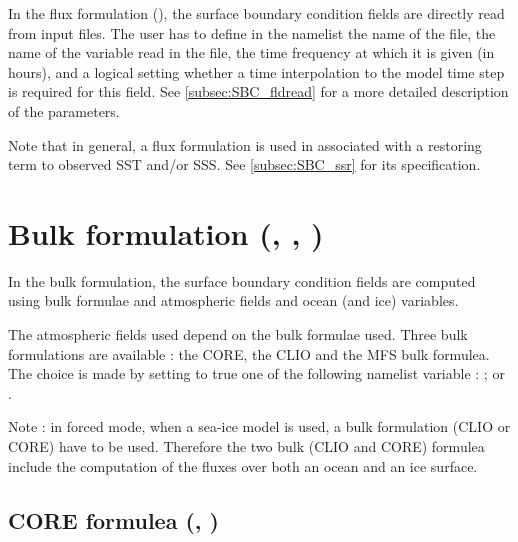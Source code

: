 \documentclass[../tex_main/NEMO_manual]{subfiles}
\begin{document}
In the flux formulation (), the surface boundary 
condition fields are directly read from input files. The user has to define 
in the namelist  the name of the file, the name of the variable 
read in the file, the time frequency at which it is given (in hours), and a logical 
setting whether a time interpolation to the model time step is required 
for this field. See \autoref{subsec:SBC_fldread} for a more detailed description of the parameters.

Note that in general, a flux formulation is used in associated with a 
restoring term to observed SST and/or SSS. See \autoref{subsec:SBC_ssr} for its 
specification.


\section[Bulk formulation {(\textit{sbcblk\{\_core,\_clio,\_mfs\}.F90})}]
			{Bulk formulation {(\protect{}, \protect{}, \protect{})}}
\label{sec:SBC_blk}

In the bulk formulation, the surface boundary condition fields are computed 
using bulk formulae and atmospheric fields and ocean (and ice) variables. 

The atmospheric fields used depend on the bulk formulae used. Three bulk formulations 
are available : the CORE, the CLIO and the MFS bulk formulea. The choice is made by setting to true
one of the following namelist variable :  ;  or  .

Note : in forced mode, when a sea-ice model is used, a bulk formulation (CLIO or CORE) have to be used. 
Therefore the two bulk (CLIO and CORE) formulea include the computation of the fluxes over both 
an ocean and an ice surface. 

\subsection{CORE formulea (\protect{}, \protect{})}
\label{subsec:SBC_blk_core}
%
\end{document}
